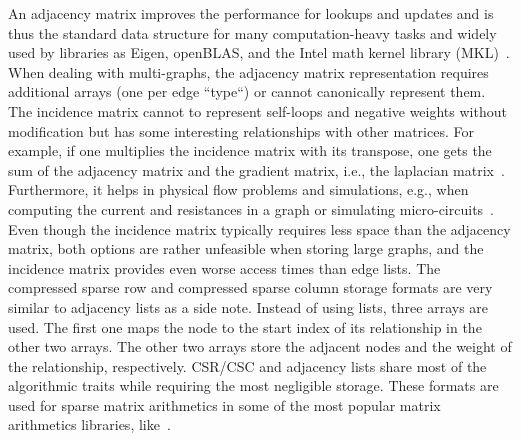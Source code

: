             An adjacency matrix improves the performance for lookups and updates and is thus the standard data structure for many computation-heavy tasks and widely used by libraries as Eigen, openBLAS, and the Intel math kernel library (MKL)~\autocite{MatrixStorageSchemes-2021-03-05, EigenTheMatrixclass-2020-12-05, MatrixStorageSchemes-1999-10-01}. 
            When dealing with multi-graphs, the adjacency matrix representation requires additional arrays (one per edge ``type``) or cannot canonically represent them.       
            The incidence matrix cannot to represent self-loops and negative weights without modification but has some interesting relationships with other matrices. 
            For example, if one multiplies the incidence matrix with its transpose, one gets the sum of the adjacency matrix and the gradient matrix, i.e., the laplacian matrix~\autocite{brouwer2011spectra}. 
            Furthermore, it helps in physical flow problems and simulations, e.g., when computing the current and resistances in a graph or simulating micro-circuits~\autocite{weinberg1958kirchhoff}.
            Even though the incidence matrix typically requires less space than the adjacency matrix, both options are rather unfeasible when storing large graphs, and the incidence matrix provides even worse access times than edge lists.        
            The compressed sparse row and compressed sparse column storage formats are very similar to adjacency lists as a side note. 
            Instead of using lists, three arrays are used. 
            The first one maps the node to the start index of its relationship in the other two arrays. 
            The other two arrays store the adjacent nodes and the weight of the relationship, respectively. 
            CSR/CSC and adjacency lists share most of the algorithmic traits while requiring the most negligible storage. 
            These formats are used for sparse matrix arithmetics in some of the most popular matrix arithmetics libraries, like~\autocite{MatrixStorageSchemes-2021-03-05, EigenTheMatrixclass-2020-12-05, MatrixStorageSchemes-1999-10-01}. 
            

